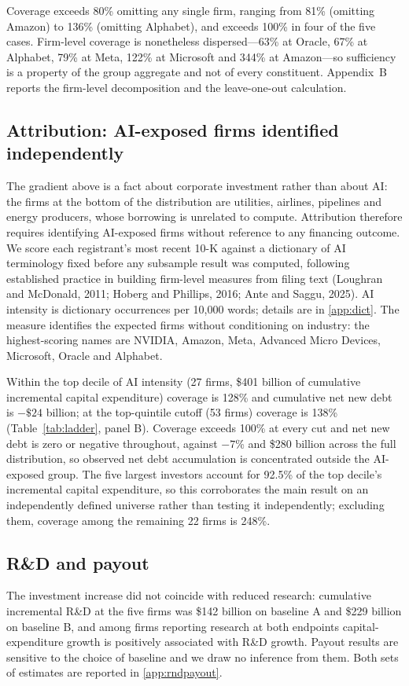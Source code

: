 \documentclass[preprint,11pt]{elsarticle}
\begin{document}
Coverage exceeds 80\% omitting any single firm, ranging from 81\% (omitting Amazon) to 136\%
(omitting Alphabet), and exceeds 100\% in four of the five cases. Firm-level coverage is nonetheless
dispersed---63\% at Oracle, 67\% at Alphabet, 79\% at Meta, 122\% at Microsoft and 344\% at
Amazon---so sufficiency is a property of the group aggregate and not of every constituent. Appendix~B
reports the firm-level decomposition and the leave-one-out calculation.

\subsection{Attribution: AI-exposed firms identified independently}\label{sec:ai}
The gradient above is a fact about corporate investment rather than about AI: the firms at the
bottom of the distribution are utilities, airlines, pipelines and energy producers, whose borrowing
is unrelated to compute. Attribution therefore requires identifying AI-exposed firms without
reference to any financing outcome. We score each registrant's most recent 10-K against a dictionary
of AI terminology fixed before any subsample result was computed, following established practice in
building firm-level measures from filing text (Loughran and McDonald, 2011; Hoberg and Phillips,
2016; Ante and Saggu, 2025).
AI intensity is dictionary occurrences per 10{,}000 words; details are in \ref{app:dict}. The
measure identifies the expected firms without conditioning on industry: the highest-scoring names
are NVIDIA, Amazon, Meta, Advanced Micro Devices, Microsoft, Oracle and Alphabet.

Within the top decile of AI intensity (27 firms, \$401 billion of cumulative incremental capital
expenditure) coverage is 128\% and cumulative net new debt is $-\$24$ billion; at the top-quintile
cutoff (53 firms) coverage is 138\% (Table~\ref{tab:ladder}, panel B). Coverage exceeds 100\% at
every cut and net new debt is zero or negative throughout, against $-7$\% and \$280 billion across
the full distribution, so observed net debt accumulation is concentrated outside the AI-exposed
group. The five largest investors account for 92.5\% of the top decile's incremental capital
expenditure, so this corroborates the main result on an independently defined universe rather than
testing it independently; excluding them, coverage among the remaining 22 firms is 248\%.

\subsection{R\&D and payout}
The investment increase did not coincide with reduced research: cumulative incremental R\&D at the
five firms was \$142 billion on baseline A and \$229 billion on baseline B, and among firms
reporting research at both endpoints capital-expenditure growth is positively associated with R\&D
growth. Payout results are sensitive to the choice of baseline and we draw no inference from them.
Both sets of estimates are reported in \ref{app:rndpayout}.
\end{document}
